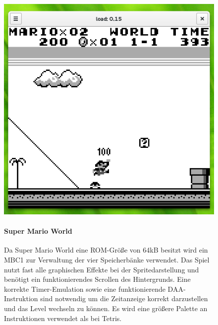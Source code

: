 \documentclass[a4paper]{scrartcl}
\begin{document}
\begin{figure}[H]
  \includegraphics[width=\linewidth]{img/mario}
\endminipage\hfill
{}
  \paragraph{Super Mario World}
  Da Super Mario World eine ROM-Größe von 64kB besitzt wird ein MBC1 zur Verwaltung der vier Speicherbänke verwendet. Das Spiel nutzt fast alle graphischen Effekte bei der Spritedarstellung  und benötigt ein funktionierendes Scrollen des Hintergrunds. Eine korrekte Timer-Emulation sowie eine funktionierende DAA-Instruktion sind notwendig um die Zeitanzeige korrekt darzustellen und das Level wechseln zu können. Es wird eine größere Palette an Instruktionen verwendet als bei Tetris.
\endminipage
\end{figure}
\end{document}
